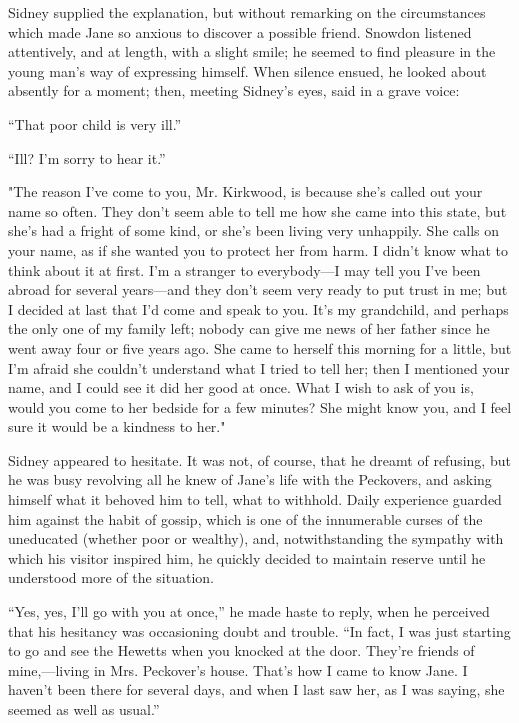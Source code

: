 Sidney supplied the explanation, but without remarking on the
circumstances which made Jane so anxious to discover a possible friend.
Snowdon listened attentively, and at length, with a slight smile; he
seemed to find pleasure in the young man's way of expressing himself.
When silence ensued, he looked about absently for a moment; then,
meeting Sidney's eyes, said in a grave voice:

``That poor child is very ill.''

``Ill? I'm sorry to hear it.''

"The reason I've come to you, Mr. Kirkwood, is because she's called out
your name so often. They don't seem able to tell me {}how she came into
this state, but she's had a fright of some kind, or she's been living
very unhappily. She calls on your name, as if she wanted you to protect
her from harm. I didn't know what to think about it at first. I'm a
stranger to everybody---I may tell you I've been abroad for several
years---and they don't seem very ready to put trust in me; but I decided
at last that I'd come and speak to you. It's my grandchild, and perhaps
the only one of my family left; nobody can give me news of her father
since he went away four or five years ago. She came to herself this
morning for a little, but I'm afraid she couldn't understand what I
tried to tell her; then I mentioned your name, and I could see it did
her good at once. What I wish to ask of you is, would you come to her
bedside for a few minutes? She might know you, and I feel sure it would
be a kindness to her."

Sidney appeared to hesitate. It was not, of course, that he dreamt of
refusing, but he was busy revolving all he knew of Jane's life with the
Peckovers, and asking himself {}what it behoved him to tell, what to
withhold. Daily experience guarded him against the habit of gossip,
which is one of the innumerable curses of the uneducated (whether poor
or wealthy), and, notwithstanding the sympathy with which his visitor
inspired him, he quickly decided to maintain reserve until he understood
more of the situation.

``Yes, yes, I'll go with you at once,'' he made haste to reply, when he
perceived that his hesitancy was occasioning doubt and trouble. ``In
fact, I was just starting to go and see the Hewetts when you knocked at
the door. They're friends of mine,---living in Mrs. Peckover's house.
That's how I came to know Jane. I haven't been there for several days,
and when I last saw her, as I was saying, she seemed as well as usual.''

